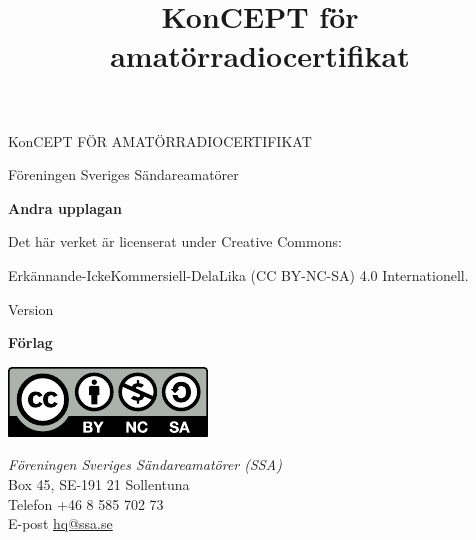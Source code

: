 \vspace{10em}
\title{KonCEPT för amatörradiocertifikat}
\begin{center}
\Large{KonCEPT FÖR AMATÖRRADIOCERTIFIKAT}

Föreningen Sveriges Sändareamatörer

\vspace{2\baselineskip}

\end{center}


\vfill

\noindent \textbf{Andra upplagan}

\vspace{1ex}

\noindent Det här verket är licenserat under Creative Commons:

\noindent Erkännande-IckeKommersiell-DelaLika (CC BY-NC-SA) 4.0 Internationell.

\vspace{1ex}

\noindent Version \revision




\vfill \vfill

\noindent
\textbf{Förlag}

\begin{marginfigure}
	\includegraphics[]{images/cc-by-nc-sa}
\end{marginfigure}

\noindent
\textit{Föreningen Sveriges Sändareamatörer (SSA)}\\
Box 45, SE-191 21 Sollentuna\\
Telefon +46 8 585 702 73\\
E-post \href{mailto:hq@ssa.se}{hq@ssa.se}\\[\baselineskip]
